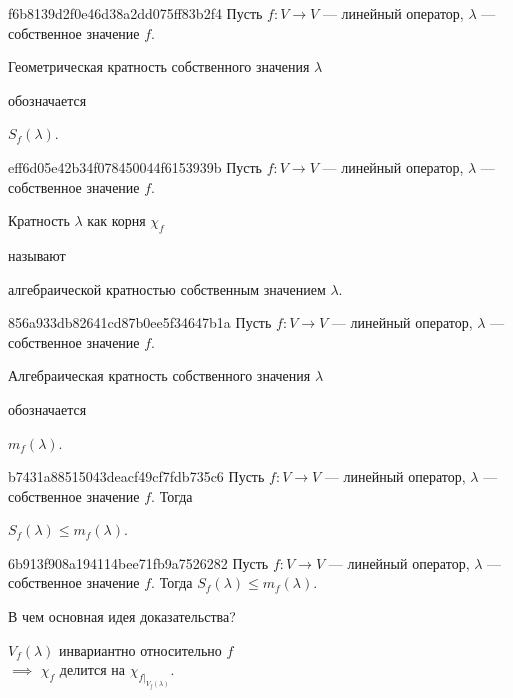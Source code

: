 \begin{note}{f6b8139d2f0e46d38a2dd075ff83b2f4}
    Пусть \( f : V \to V \) --- линейный оператор, \( \lambda \) --- собственное значение \( f \).
    \begin{icloze}{2}Геометрическая кратность собственного значения \( \lambda \)\end{icloze} обозначается \begin{icloze}{1}\( S_f (\lambda) \).\end{icloze}
\end{note}

\begin{note}{eff6d05e42b34f078450044f6153939b}
    Пусть \( f : V \to V \) --- линейный оператор, \( \lambda \) --- собственное значение \( f \).
    \begin{icloze}{1}Кратность \( \lambda \) как корня \( \chi_f \)\end{icloze} называют \begin{icloze}{2}алгебраической кратностью собственным значением \( \lambda \).\end{icloze}
\end{note}

\begin{note}{856a933db82641cd87b0ee5f34647b1a}
    Пусть \( f : V \to V \) --- линейный оператор, \( \lambda \) --- собственное значение \( f \).
    \begin{icloze}{2}Алгебраическая кратность собственного значения \( \lambda \)\end{icloze} обозначается \begin{icloze}{1}\( m_f (\lambda) \).\end{icloze}
\end{note}

\begin{note}{b7431a88515043deacf49cf7fdb735c6}
    Пусть \( f : V \to V \) --- линейный оператор, \( \lambda \) --- собственное значение \( f \).
    Тогда \begin{icloze}{1}\( S_f (\lambda) \leqslant m_f (\lambda) \).\end{icloze}
\end{note}

\begin{note}{6b913f908a194114bee71fb9a7526282}
    Пусть \( f : V \to V \) --- линейный оператор, \( \lambda \) --- собственное значение \( f \).
    Тогда \( S_f (\lambda) \leqslant m_f (\lambda) \).

    В чем основная идея доказательства?

    \begin{cloze}{1}
        \( V_f (\lambda) \) инвариантно относительно \( f \) \\
        \phantom{} \hfill \( \implies \) \( \chi_f \) делится на \( \chi_{f|_{V_f(\lambda)}} \).
    \end{cloze}
\end{note}

